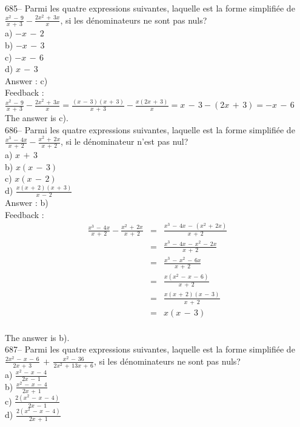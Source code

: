 \documentclass[letterpaper, 12pt]{article}
\begin{document}
685-- Parmi les quatre expressions suivantes, laquelle est la forme
simplifi\'ee de $\frac{x^{2}\,-\,9}{x\,+\,3}-\frac{2x^{2}\,+\,3x}{x}$, si
les d\'enominateurs ne sont pas nuls?\\
a) $-x\,-\,2$\\
b) $-x\,-\,3$\\
c) $-x\,-\,6$\\
d) $x\,-\,3$\\

Answer : c)\\

Feedback : \\[2mm]
$\frac{x^{2}\,-\,9}{x\,+\,3}-\frac{2x^{2}\,+\,3x}{x}=\frac{\left(
x\,-\,3\right) \left( x\,+\,3\right) }{x\,+\,3} -\frac{x\left(
2x\,+\,3\right) }{x}=x\,-\,3-\left( 2x\,+\,3\right) =-x\,-\,6$\\[2mm]
The answer is c).\\

686-- Parmi les quatre expressions suivantes, laquelle est la forme
simplifi\'ee de $\frac{x^{3}\,-\,4x}{x\,+\,2}-\frac{x^{2}\,+\,2x}{x\,+\,2}$,
si le d\'enominateur n'est pas nul?\\
a) $ x\,+\,3$\\[2mm]
b) $x\left( x\,-\,3\right) $\\[2mm]
c) $x\left( x\,-\,2\right) $\\[2mm]
d) $\frac{x\left( x\,+\,2\right) \left( x\,+\,3\right)}{x\,-\,2}$\\

Answer : b)\\

Feedback : \\
\begin{eqnarray*}
\frac{x^{3}\,-\,4x}{x\,+\,2}-\frac{x^{2}\,+\,2x}{x\,+\,2}&=&\frac{x^{3}\,-\,4x\,-\,(x^{2}\,+\,2x)}{x\,+\,2}\\[2mm]
&=&\frac{x^{3}\,-\,4x\,-\,x^{2}\,-\,2x}{x\,+\,2}\\[2mm]
&=&\frac{x^{3}\,-\,x^{2}\,-\,6x}{x\,+\,2}\\[2mm]
&=&\frac{x(x^{2}\,-\,x\,-\,6)}{x\,+\,2}\\[2mm]
&=&\frac{x(x\,+\,2)(x\,-\,3)}{x\,+\,2}\\[2mm]
&=&x(x\,-\,3)\\
\end{eqnarray*}

The answer is b).\\

687-- Parmi les quatre expressions suivantes, laquelle est la forme
simplifi\'ee de
$\frac{2x^{2}\,-\,x\,-\,6}{2x\,+\,3}\,+\,\frac{x^{2}\,-\,36}{2x^{2}\,+\,13x\,+\,6}$,
si les d\'enominateurs ne sont pas nuls?\\
a) $\frac{x^{2}\,-\,x\,-\,4}{2x\,-\,1}$\\[2mm]
b) $\frac{x^{2}\,-\,x\,-\,4}{2x\,+\,1}$\\[2mm]
c) $\frac{2(x^{2}\,-\,x\,-\,4)}{2x\,-\,1}$\\[2mm]
d) $\frac{2(x^{2}\,-\,x\,-\,4)}{2x\,+\,1}$\\[2mm]
\end{document}
